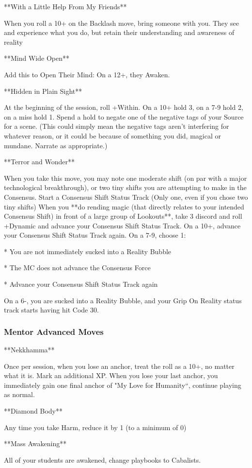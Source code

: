\documentclass[
  oneside,
  statementpaper,
  9pt]{memoir}
\begin{document}
\begin{Player}

**With a Little Help From My Friends**

When you roll a 10+ on the Backlash move, bring someone with you. They see and experience what you do, but retain their understanding and awareness of reality

**Mind Wide Open**

Add this to Open Their Mind: On a 12+, they Awaken.

**Hidden in Plain Sight**

At the beginning of the session, roll +Within. On a 10+ hold 3, on a 7-9 hold 2, on a miss hold 1. Spend a hold to negate one of the negative tags of your Source for a scene. (This could simply mean the negative tags aren't interfering for whatever reason, or it could be because of something you did, magical or mundane. Narrate as appropriate.)

**Terror and Wonder**

When you take this move, you may note one moderate shift (on par with a major technological breakthrough), or two tiny shifts you are attempting to make in the Consensus. Start a Consensus Shift Status Track (Only one, even if you chose two tiny shifts) When you **do rending magic (that directly relates to your intended Consensus Shift) in front of a large group of Lookouts**, take 3 discord and roll +Dynamic and advance your Consensus Shift Status Track. On a 10+, advance your Consensus Shift Status Track again. On a 7-9, choose 1:

* You are not immediately sucked into a Reality Bubble

* The MC does not advance the Consensus Force

* Advance your Consensus Shift Status Track again

On a 6-, you are sucked into a Reality Bubble, and your Grip On Reality status track starts having hit Code 30.

\end{Player}

\hypertarget{mentor-advanced-moves}{%
\subsubsection{Mentor Advanced Moves}\label{mentor-advanced-moves}}

\begin{Player}

**Nekkhamma**

Once per session, when you lose an anchor, treat the roll as a 10+, no matter what it is. Mark an additional XP. When you lose your last anchor, you immediately gain one final anchor of "My Love for Humanity“, continue playing as normal.

**Diamond Body**

Any time you take Harm, reduce it by 1 (to a minimum of 0)

**Mass Awakening**

All of your students are awakened, change playbooks to Cabalists.

\end{Player}
\end{document}
